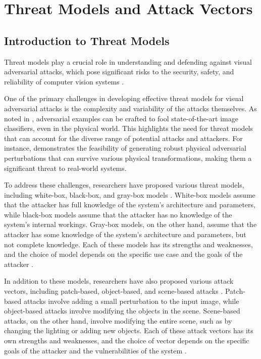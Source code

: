 \documentclass[11pt,a4paper]{article}
\begin{document}
\section{Threat Models and Attack Vectors}



\subsection{Introduction to Threat Models}


Threat models play a crucial role in understanding and defending against visual adversarial attacks, which pose significant risks to the security, safety, and reliability of computer vision systems \cite{doi:10.1016/j.eng.2019.12.012}. 

One of the primary challenges in developing effective threat models for visual adversarial attacks is the complexity and variability of the attacks themselves. As noted in \cite{doi:10.24963/ijcai.2021/694}, adversarial examples can be crafted to fool state-of-the-art image classifiers, even in the physical world. This highlights the need for threat models that can account for the diverse range of potential attacks and attackers. For instance, \cite{arxiv:1707.08945} demonstrates the feasibility of generating robust physical adversarial perturbations that can survive various physical transformations, making them a significant threat to real-world systems.

To address these challenges, researchers have proposed various threat models, including white-box, black-box, and gray-box models \cite{doi:10.1109/access.2018.2807385}. White-box models assume that the attacker has full knowledge of the system's architecture and parameters, while black-box models assume that the attacker has no knowledge of the system's internal workings. Gray-box models, on the other hand, assume that the attacker has some knowledge of the system's architecture and parameters, but not complete knowledge. Each of these models has its strengths and weaknesses, and the choice of model depends on the specific use case and the goals of the attacker \cite{doi:10.1007/s11633-019-1211-x}.

In addition to these models, researchers have also proposed various attack vectors, including patch-based, object-based, and scene-based attacks \cite{doi:10.1007/978-3-030-10925-7_4}. Patch-based attacks involve adding a small perturbation to the input image, while object-based attacks involve modifying the objects in the scene. Scene-based attacks, on the other hand, involve modifying the entire scene, such as by changing the lighting or adding new objects. Each of these attack vectors has its own strengths and weaknesses, and the choice of vector depends on the specific goals of the attacker and the vulnerabilities of the system \cite{arxiv:1802.06430}.
\end{document}
